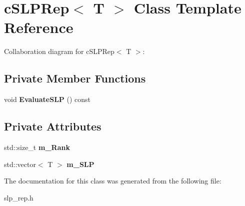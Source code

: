 \hypertarget{classcSLPRep}{\section{c\-S\-L\-P\-Rep$<$ T $>$ Class Template Reference}
\label{classcSLPRep}
}


Collaboration diagram for c\-S\-L\-P\-Rep$<$ T $>$\-:
\subsection*{Private Member Functions}
\begin{DoxyCompactItemize}
\item 
\hypertarget{classcSLPRep_a426437f339e324639960d31d80a88c16}{void {\bfseries Evaluate\-S\-L\-P} () const }\label{classcSLPRep_a426437f339e324639960d31d80a88c16}

\end{DoxyCompactItemize}
\subsection*{Private Attributes}
\begin{DoxyCompactItemize}
\item 
\hypertarget{classcSLPRep_a5da028fd67619a049145140669a44eb1}{std\-::size\-\_\-t {\bfseries m\-\_\-\-Rank}}\label{classcSLPRep_a5da028fd67619a049145140669a44eb1}

\item 
\hypertarget{classcSLPRep_a8545e9ddf3197b62c4cd38fbae189a26}{std\-::vector$<$ T $>$ {\bfseries m\-\_\-\-S\-L\-P}}\label{classcSLPRep_a8545e9ddf3197b62c4cd38fbae189a26}

\end{DoxyCompactItemize}


The documentation for this class was generated from the following file\-:\begin{DoxyCompactItemize}
\item 
slp\-\_\-rep.\-h\end{DoxyCompactItemize}
